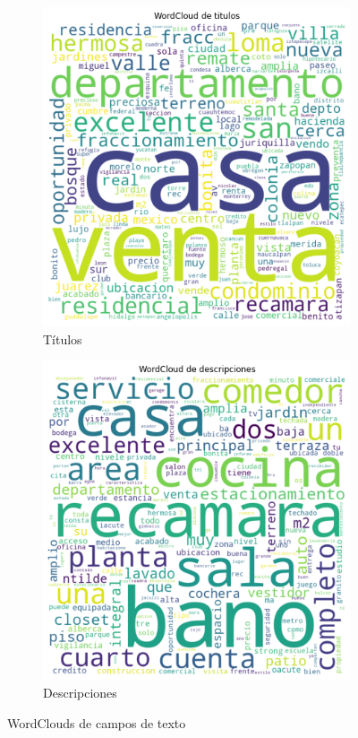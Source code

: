     \begin{figure}[H]
        \begin{subfigure}{.49\textwidth}
            \centering
            \includegraphics[scale=.5]{img/cmp/wc/wc-title.png}
            \caption{Títulos}
        \end{subfigure}
        \begin{subfigure}{.49\textwidth}
            \centering
            \includegraphics[scale=.5]{img/cmp/wc/wc-desc.png}
            \caption{Descripciones}
        \end{subfigure}
        \caption{WordClouds de campos de texto}
        \label{fig:wc}
    \end{figure}
    
